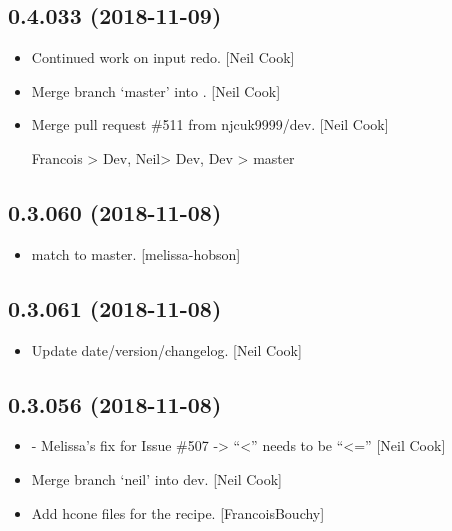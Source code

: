 \documentclass[a4paper,10pt,english]{report}
\begin{document}
\subsection{0.4.033 (2018-11-09)}
\label{\detokenize{misc/changelog:id263}}\begin{itemize}
\item {} 
Continued work on input redo. {[}Neil Cook{]}

\item {} 
Merge branch ‘master’ into . {[}Neil Cook{]}

\item {} 
Merge pull request \#511 from njcuk9999/dev. {[}Neil Cook{]}

Francois \textendash{}\textgreater{} Dev, Neil\textendash{}\textgreater{} Dev, Dev \textendash{}\textgreater{} master

\end{itemize}


\subsection{0.3.060 (2018-11-08)}
\label{\detokenize{misc/changelog:id264}}\begin{itemize}
\item {} 
 match to master. {[}melissa-hobson{]}

\end{itemize}


\subsection{0.3.061 (2018-11-08)}
\label{\detokenize{misc/changelog:id265}}\begin{itemize}
\item {} 
Update date/version/changelog. {[}Neil Cook{]}

\end{itemize}


\subsection{0.3.056 (2018-11-08)}
\label{\detokenize{misc/changelog:id266}}\begin{itemize}
\item {} 
 - Melissa’s fix for Issue \#507 -\textgreater{}   “\textless{}” needs to be “\textless{}=”
{[}Neil Cook{]}

\item {} 
Merge branch ‘neil’ into dev. {[}Neil Cook{]}

\item {} 
Add hcone files for the  recipe. {[}FrancoisBouchy{]}

\end{itemize}
\end{document}
